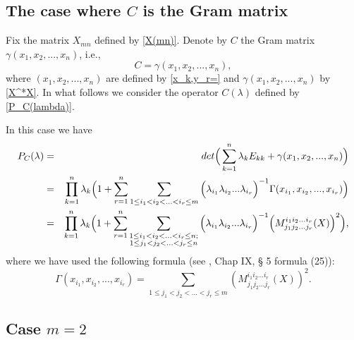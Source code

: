 \documentclass[preprint,12pt]{elsarticle}
\numberwithin{equation}{section}
\begin{document}
\subsection{The case where $C$ is the Gram matrix}
Fix the matrix $X_{mn}$ defined by \eqref{X(mn)}. Denote by $C$ the Gram matrix 
$\gamma(x_1,x_2,..., x_n)$, 
i.e.,
\begin{equation}
\label{C=gamma}
C=\gamma(x_1,x_2,..., x_n),
\end{equation}
where $(x_1,x_2,..., x_n)$ are defined by \eqref{x_k,y_r=} 
and $\gamma(x_1,x_2,..., x_n)$  by \eqref{X^*X}.
In what follows we consider the operator $C(\lambda)$  defined  
by \eqref{P_C(lambda)}.
\begin{rem}
 \label{r.P_C(lam).7}
In this case  we have
\begin{eqnarray}
 \label{G.detC-LI.2} 
P_C(\lambda)&=&
{\rm det}\Big(\sum_{k=1}^n\lambda_kE_{kk}+\gamma(x_1,x_2,...,
x_n)\Big)\\
\nonumber
%
&=&\prod_{k=1}^n\lambda_k\Big(1+\sum_{r=1}^n\sum_{1\leq
	i_1<i_2<...<i_r\leq
	m}\Big(\lambda_{i_1}\lambda_{i_2}...\lambda_{i_r}\Big)^{-1}
\Gamma(x_{i_1},x_{i_2},...,x_{i_r})\Big)\\
\nonumber
&=&\prod_{k=1}^n\lambda_k\Big(1+\sum_{r=1}^{n} \sum_{
\substack{1\leq i_1<i_2<...<i_r\leq n;\\
1\leq j_1<j_2<...<j_r\leq n}
}
\Big(\lambda_{i_1}\lambda_{i_2}...\lambda_{i_r}\Big)^{-1}
\Big(M^{i_1i_2...i_r}_{j_1j_2...j_r}(X)\Big)^2\Big),
\end{eqnarray}
where we have used the following formula (see \cite{Gan58}, Chap IX, \S
5 formula (25)):
\begin{equation}
\label{Gramm(x,y)=M^2(X)}
\Gamma(x_{i_1},x_{i_2},...,x_{i_r})= \sum_{1\leq
	j_1<j_2<...<j_r\leq m}
\left(M^{i_1i_2...i_r}_{j_1j_2...j_r}(X)\right)^2.
\end{equation}
\end{rem}

\subsection{Case $m=2$}
\end{document}
